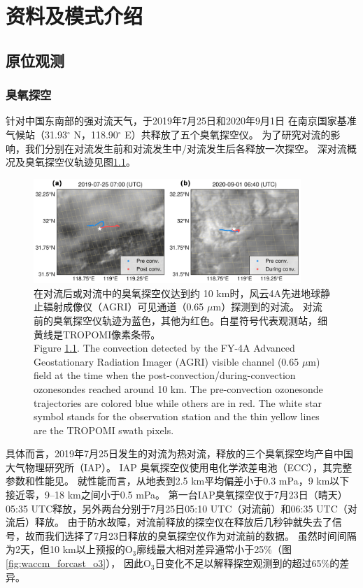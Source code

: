 
\chapter{资料及模式介绍}

\section{原位观测}

\subsection{臭氧探空}

针对中国东南部的强对流天气，于2019年7月25日和2020年9月1日
在南京国家基准气候站（31.93$^{\circ}$ N，118.90$^{\circ}$ E）共释放了五个臭氧探空仪。
为了研究对流的影响，我们分别在对流发生前和对流发生中/对流发生后各释放一次探空。
深对流概况及臭氧探空仪轨迹见图\ref{fig:ozonesonde}。

\begin{figure}[H]
\centering
\includegraphics[width=0.9\textwidth]{./figures/ozonesonde.png}
\caption{在对流后或对流中的臭氧探空仪达到约 10 km时，风云4A先进地球静止辐射成像仪（AGRI）可见通道（0.65 $\mu$m）探测到的对流。
对流前的臭氧探空仪轨迹为蓝色，其他为红色。白星符号代表观测站，细黄线是TROPOMI像素条带。\\
Figure \ref{fig:ozonesonde}. The convection detected by the FY-4A Advanced Geostationary Radiation Imager (AGRI)
visible channel (0.65 $\mu$m) field at the time when the post-convection/during-convection ozonesondes reached around 10 km.
The pre-convection ozonesonde trajectories are colored blue while others are in red.
The white star symbol stands for the observation station and the thin yellow lines are the TROPOMI swath pixels.
}
\label{fig:ozonesonde}
\end{figure}


具体而言，2019年7月25日发生的对流为热对流，释放的三个臭氧探空均产自中国大气物理研究所（IAP）。
IAP 臭氧探空仪使用电化学浓差电池（ECC），其完整参数和性能见\citet{Zhang.2014}。
就性能而言，从地表到2.5 km平均偏差小于0.3 mPa，9 km以下接近零，9--18 km之间小于0.5 mPa。
第一台IAP臭氧探空仪于7月23日（晴天）05:35 UTC释放，另外两台分别于7月25日05:10 UTC（对流前）和06:35 UTC（对流后）释放。
由于防水故障，对流前释放的探空仪在释放后几秒钟就失去了信号，故而我们选择了7月23日释放的臭氧探空仪作为对流前的数据。
虽然时间间隔为2天，但10 km以上预报的O$_3$廓线最大相对差异通常小于25\%（图\ref{fig:waccm_forcast_o3}），
因此O$_3$日变化不足以解释探空观测到的超过65\%的差异。

